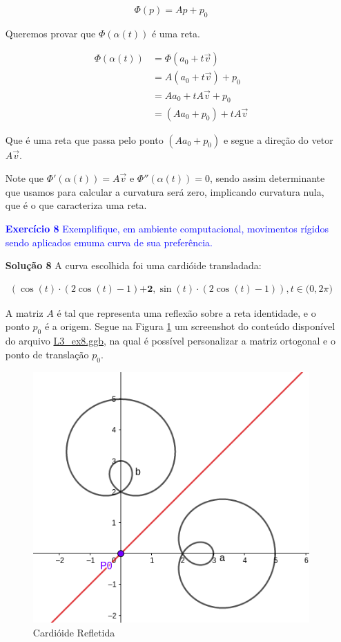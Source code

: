 \documentclass[12pt,letterpaper]{article}
\newcommand{\ex}[1]{\textcolor{blue}{\textbf{Exercício #1}}}
\newcommand{\sol}[1]{\textbf{Solução #1}}
\begin{document}
\begin{enumerate}
	$$\Phi(p)=Ap+p_0$$
	
	Queremos provar que $\Phi(\alpha(t))$ é uma reta.
	
	\begin{align*}
		\Phi(\alpha(t))&=\Phi(a_0+t\vec v)\\
		&=A(a_0+t\vec v)+p_0\\
		&=Aa_0+tA\vec v +p_0\\
		&=(Aa_0+p_0)+tA\vec v
	\end{align*}

	Que é uma reta que passa pelo ponto $(Aa_0+p_0)$ e segue a direção do vetor $A\vec v$.
	
	Note que  $\Phi'(\alpha(t))=A\vec v$ e $\Phi''(\alpha(t))=0$, sendo assim determinante que usamos para calcular a curvatura será zero, implicando curvatura nula, que é o que caracteriza uma reta.
	
	\item[\ex{8}]\textcolor{blue}{Exemplifique, em ambiente computacional, movimentos rígidos sendo aplicados emuma curva de sua preferência.}
	
	
	\item[\sol{8}] A curva escolhida foi uma cardióide transladada:
	
	\begin{align*}
		(\cos(t)\cdot(2\cos(t)-1)\boldsymbol{+2},\sin(t)\cdot(2\cos(t)-1)),t\in\mathbb(0,2\pi)
	\end{align*}

	A matriz $A$ é tal que representa uma reflexão sobre a reta identidade, e o ponto $p_0$ é a origem. Segue na Figura \ref{ex8} um screenshot do conteúdo disponível do arquivo \href{https://github.com/reneroliveira/Curves_and_Surfaces/blob/main/ggb_files/L3_ex8.ggb}{L3\_ex8.ggb}, na qual é possível personalizar a matriz ortogonal e o ponto de translação $p_0$.
	\begin{figure}[!htb]
		\centering
		\includegraphics[scale=0.7]{../images/L3_ex8.png}
		\caption{Cardióide Refletida}
		\label{ex8}
	\end{figure}
	\end{enumerate}


	
	\newpage
	
	
	
\end{document}
